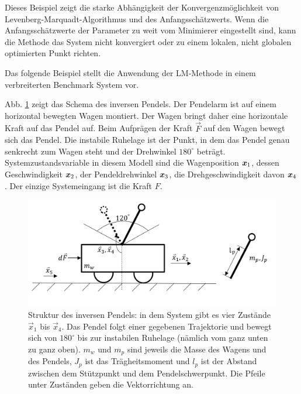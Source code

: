 Dieses Beispiel zeigt die starke Abhängigkeit der Konvergenzmöglichkeit von Levenberg-Marquadt-Algorithmus und des Anfangsschätzwerts. Wenn die Anfangsschätzwerte der Parameter zu weit vom Minimierer eingestellt sind, kann die Methode das System nicht konvergiert oder zu einem lokalen, nicht globalen optimierten Punkt richten.

Das folgende Beispiel stellt die Anwendung der LM-Methode in einem verbreiterten Benchmark System vor.

\begin{beispiel}
	Abb. \ref{fig:Inverses-Pendel} zeigt das Schema des inversen Pendels. Der Pendelarm ist auf einem horizontal bewegten Wagen montiert. Der Wagen bringt daher eine horizontale Kraft auf das Pendel auf. Beim Aufprägen der Kraft $\vec{F}$ auf den Wagen bewegt sich das Pendel. Die instabile Ruhelage ist der Punkt, in dem das Pendel genau senkrecht zum Wagen steht und der Drehwinkel $180^{\circ}$ beträgt. Systemzustandsvariable in diesem Modell sind die Wagenposition $\boldsymbol x_{1}$, dessen Geschwindigkeit $\boldsymbol x_{2}$, der Pendeldrehwinkel $\boldsymbol x_{3}$, die Drehgeschwindigkeit davon $\boldsymbol x_{4}$. Der einzige Systemeingang ist die Kraft $F$.
	\begin{figure}
		\centering
		\includegraphics[width=15cm]{Inverse-Pendel.png}
		\caption{Struktur des inversen Pendels: in dem System gibt es vier Zustände $\vec{x}_{1}$ bis $\vec{x}_{4}$. Das Pendel folgt einer gegebenen Trajektorie und bewegt sich von $180^{\circ}$ bis zur instabilen Ruhelage (nämlich vom ganz unten zu ganz oben). $m_{w}$ und $m_{p}$ sind jeweils die Masse des Wagens und des Pendels, $J_{p}$ ist das Trägheitsmoment und $l_{p}$ ist der Abstand zwischen dem Stützpunkt und dem Pendelschwerpunkt. Die Pfeile unter Zuständen geben die Vektorrichtung an.}
		\label{fig:Inverses-Pendel}
	\end{figure}  


\end{beispiel}
